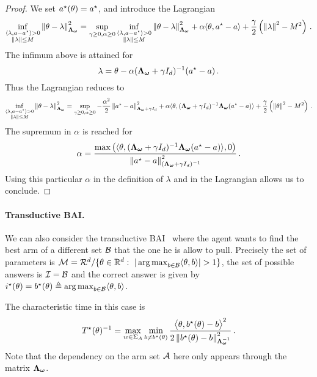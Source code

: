 \begin{proof}
We set $a^\star(\theta) = a^\star$, and introduce the Lagrangian
\[
 \inf_{\substack{\langle \lambda,a-a^\star \rangle>0\\ \left\lVert\lambda\right\rVert\leq M}} \left\lVert\theta -\lambda \right\rVert_{{\boldsymbol \Lambda}_{{\boldsymbol \omega}}}^2 = \sup_{\gamma\geq 0, \alpha\geq 0} \inf_{\substack{\langle \lambda,a-a^\star\rangle>0\\ \left\lVert\lambda\right\rVert\leq M}} \left\lVert\theta -\lambda \right\rVert_{{\boldsymbol \Lambda}_{{\boldsymbol \omega}}}^2 +\alpha \langle \theta, a^\star-a\rangle + \frac{\gamma}{2}\left(\left\lVert\lambda\right\rVert^2-M^2 \right)\,.
\]
The infimum above is attained for
\[
\lambda = \theta - \alpha ({\boldsymbol \Lambda}_{{\boldsymbol \omega}} + \gamma I_d)^{-1}(a^\star-a)\,.
\]
Thus the Lagrangian reduces to
\[
\inf_{\substack{\langle \lambda,a-a^\star \rangle>0\\ \left\lVert\lambda\right\rVert\leq M}} \left\lVert\theta -\lambda \right\rVert_{{\boldsymbol \Lambda}_{{\boldsymbol \omega}}}^2 = \sup_{\gamma\geq 0, \alpha\geq 0}
-\frac{\alpha^2}{2} \left\lVert a^\star-a\right\rVert^2_{{\boldsymbol \Lambda}_{{\boldsymbol \omega}}+\gamma I_d} + \alpha \langle \theta, ({\boldsymbol \Lambda}_{{\boldsymbol \omega}}+\gamma I_d)^{-1}{\boldsymbol \Lambda}_{{\boldsymbol \omega}} (a^\star-a)\rangle +\frac{\gamma}{2}\left(\left\lVert\theta\right\rVert^2-M^2 \right)\,.
\]
The supremum in $\alpha$ is reached for
\[
\alpha =\frac{\max\left(\langle \theta, ({\boldsymbol \Lambda}_{{\boldsymbol \omega}}+\gamma I_d)^{-1} {\boldsymbol \Lambda}_{{\boldsymbol \omega}} (a^\star-a)\rangle,0\right)}{\left\lVert a^\star-a\right\rVert^2_{({\boldsymbol \Lambda}_{{\boldsymbol \omega}}+\gamma I_d)^{-1}}}\,.
\]
Using this particular $\alpha$ in the definition of $\lambda$ and in the Lagrangian allows us to conclude.
\end{proof}

\paragraph{Transductive BAI.}\label{sec:lgc.formulation.examples.transductive}
We can also consider the transductive BAI~\citep{fiez2019transductive} where the agent wants to find the best arm of a different set $\mathcal{B}$ that the one he is allow to pull. Precisely the set of parameters is $\cM=\cR^d/\{\theta\in\R^d:\  |\argmax_{b\in\cB} \langle\theta,b\rangle|>1\}$, the set of possible answers is $\mathcal{I} = \mathcal{B}$ and the correct answer is given by $i^\star(\theta)=b^\star(\theta)\triangleq \operatorname*{arg\,max}_{b\in\mathcal{B}} \langle\theta,b\rangle$.

The characteristic time in this case is
\[
T^{\star}(\theta)^{-1} = \max_{w\in\Sigma_A} \min_{b\neq b^\star(\theta)} \frac{\big\langle \theta, b^\star(\theta)-b\big\rangle^2}{2 \left\lVert b^\star(\theta)-b\right\rVert_{{\boldsymbol \Lambda}_{{\boldsymbol \omega}}^{-1}}^2}\,.
\]
Note that the dependency on the arm set $\mathcal{A}$ here only appears through the matrix ${\boldsymbol \Lambda}_{{\boldsymbol \omega}}$.


